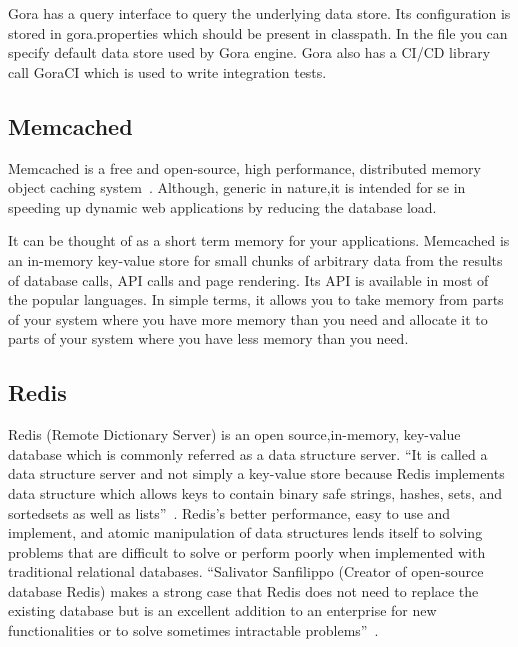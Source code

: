      Gora has a query interface to query the underlying data
     store. Its configuration is stored in gora.properties which
     should be present in classpath. In the file you can specify
     default data store used by Gora engine. Gora also has a CI/CD
     library call GoraCI which is used to write integration tests.

     \pv

\subsection{Memcached}

Memcached is a free and open-source, high performance, distributed
memory object caching system~\cite{www-memcached}.  Although, generic
in nature,it is intended for se in speeding up dynamic web
applications by reducing the database load.

     It can be thought of as a short term memory for your
     applications.  Memcached is an in-memory key-value store for
     small chunks of arbitrary data from the results of database
     calls, API calls and page rendering. Its API is available in most
     of the popular languages. In simple terms, it allows you to take
     memory from parts of your system where you have more memory than
     you need and allocate it to parts of your system where you have
     less memory than you need.

     \pv
     
\subsection{Redis}

Redis (Remote Dictionary Server) is an open source,in-memory,
key-value database which is commonly referred as a data structure
server. ``It is called a data structure server and not simply a
key-value store because Redis implements data structure which allows
keys to contain binary safe strings, hashes, sets, and sortedsets as
well as lists''~\cite{redis-book-2011}.  Redis's better performance,
easy to use and implement, and atomic manipulation of data structures
lends itself to solving problems that are difficult to solve or
perform poorly when implemented with traditional relational
databases. ``Salivator Sanfilippo (Creator of open-source database
Redis) makes a strong case that Redis does not need to replace the
existing database but is an excellent addition to an enterprise for
new functionalities or to solve sometimes intractable
problems''~\cite{redis-book-2016}.

